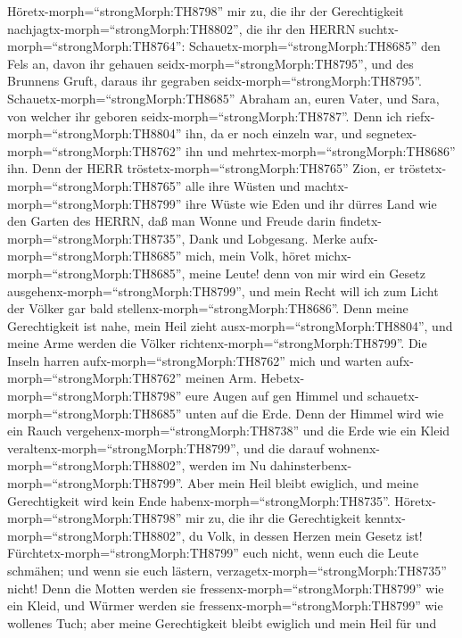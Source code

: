  Höretx-morph=``strongMorph:TH8798'' mir zu, die ihr der
Gerechtigkeit nachjagtx-morph=``strongMorph:TH8802'', die ihr den HERRN
suchtx-morph=``strongMorph:TH8764'':
Schauetx-morph=``strongMorph:TH8685'' den Fels an, davon ihr gehauen
seidx-morph=``strongMorph:TH8795'', und des Brunnens Gruft, daraus ihr
gegraben seidx-morph=``strongMorph:TH8795''. 
Schauetx-morph=``strongMorph:TH8685'' Abraham an, euren Vater, und Sara,
von welcher ihr geboren seidx-morph=``strongMorph:TH8787''. Denn ich
riefx-morph=``strongMorph:TH8804'' ihn, da er noch einzeln war, und
segnetex-morph=``strongMorph:TH8762'' ihn und
mehrtex-morph=``strongMorph:TH8686'' ihn.  Denn der HERR
tröstetx-morph=``strongMorph:TH8765'' Zion, er
tröstetx-morph=``strongMorph:TH8765'' alle ihre Wüsten und
machtx-morph=``strongMorph:TH8799'' ihre Wüste wie Eden und ihr dürres
Land wie den Garten des HERRN, daß man Wonne und Freude darin
findetx-morph=``strongMorph:TH8735'', Dank und Lobgesang. 
Merke aufx-morph=``strongMorph:TH8685'' mich, mein Volk, höret
michx-morph=``strongMorph:TH8685'', meine Leute! denn von mir wird ein
Gesetz ausgehenx-morph=``strongMorph:TH8799'', und mein Recht will ich
zum Licht der Völker gar bald stellenx-morph=``strongMorph:TH8686''.
 Denn meine Gerechtigkeit ist nahe, mein Heil zieht
ausx-morph=``strongMorph:TH8804'', und meine Arme werden die Völker
richtenx-morph=``strongMorph:TH8799''. Die Inseln harren
aufx-morph=``strongMorph:TH8762'' mich und warten
aufx-morph=``strongMorph:TH8762'' meinen Arm. 
Hebetx-morph=``strongMorph:TH8798'' eure Augen auf gen Himmel und
schauetx-morph=``strongMorph:TH8685'' unten auf die Erde. Denn der
Himmel wird wie ein Rauch vergehenx-morph=``strongMorph:TH8738'' und die
Erde wie ein Kleid veraltenx-morph=``strongMorph:TH8799'', und die
darauf wohnenx-morph=``strongMorph:TH8802'', werden im Nu
dahinsterbenx-morph=``strongMorph:TH8799''. Aber mein Heil bleibt
ewiglich, und meine Gerechtigkeit wird kein Ende
habenx-morph=``strongMorph:TH8735''. 
Höretx-morph=``strongMorph:TH8798'' mir zu, die ihr die Gerechtigkeit
kenntx-morph=``strongMorph:TH8802'', du Volk, in dessen Herzen mein
Gesetz ist! Fürchtetx-morph=``strongMorph:TH8799'' euch nicht, wenn euch
die Leute schmähen; und wenn sie euch lästern,
verzagetx-morph=``strongMorph:TH8735'' nicht!  Denn die
Motten werden sie fressenx-morph=``strongMorph:TH8799'' wie ein Kleid,
und Würmer werden sie fressenx-morph=``strongMorph:TH8799'' wie wollenes
Tuch; aber meine Gerechtigkeit bleibt ewiglich und mein Heil für und
